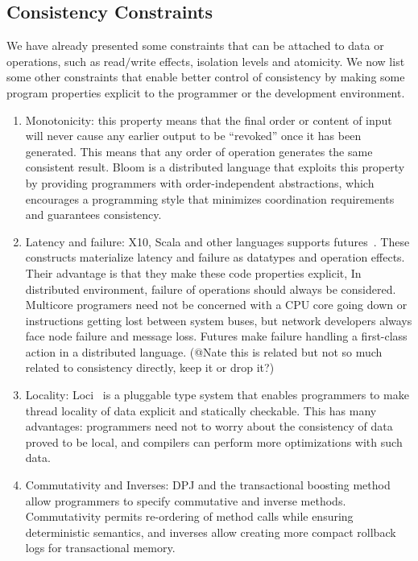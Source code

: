 \documentclass[]{usiinfprospectus}
\begin{document}
\subsection{Consistency Constraints}
We have already presented some constraints that can be attached to data or operations, such as read$/$write effects, isolation levels and atomicity. We now list some other constraints that enable better control of consistency by making some program properties explicit to the programmer or the development environment. 
\begin{enumerate}
\item Monotonicity: this property means that the final order or content of input will never cause any earlier output to be ``revoked'' once it has been generated. This means that any order of operation generates the same consistent result. Bloom is a distributed language that exploits this property by providing programmers with order-independent abstractions, which encourages a programming style that minimizes coordination requirements and guarantees consistency.~\cite{alvaro2011consistency}

\item Latency and failure: X10, Scala and other languages supports futures~\cite{hallerfutures}. These constructs materialize latency and failure as datatypes and operation effects. Their advantage is that they make these code properties explicit, In distributed environment, failure of operations should always be considered. Multicore programers need not be concerned with a CPU core going down or instructions getting lost between system buses, but network developers always face node failure and message loss. Futures make failure handling a first-class action in a distributed language. (@Nate this is related but not so much related to consistency directly, keep it or drop it?)

\item Locality: Loci~\cite{wrigstad2009loci} is a pluggable type system that enables programmers to make thread locality of data explicit and statically checkable. This has many advantages: programmers need not to worry about the consistency of data proved to be local, and compilers can perform more optimizations with such data. 

\item Commutativity and Inverses: DPJ and the transactional boosting method~\cite{herlihy2008transactional} allow programmers to specify commutative and inverse methods. Commutativity permits re-ordering of method calls while ensuring deterministic semantics, and inverses allow creating more compact rollback logs for transactional memory. 
\end{enumerate}
\end{document}
